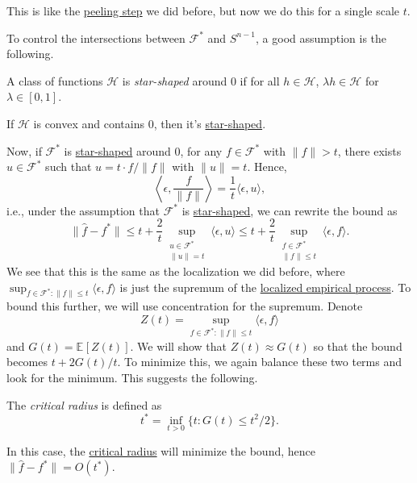 \begin{intuition}
	This is like the \hyperref[eq:peeling-step]{peeling step} we did before, but now we do this for a single scale \(t\).
\end{intuition}

To control the intersections between \(\mathscr{F} ^{\ast} \) and \(S^{n-1}\), a good assumption is the following.

\begin{definition}\label{def:star-shaped}
	A class of functions \(\mathscr{H} \) is \emph{star-shaped} around \(0\) if for all \(h\in \mathscr{H} \), \(\lambda h\in \mathscr{H} \) for \(\lambda \in [0, 1]\).
\end{definition}

\begin{eg}
	If \(\mathscr{H} \) is convex and contains \(0\), then it's \hyperref[def:star-shaped]{star-shaped}.
\end{eg}

Now, if \(\mathscr{F} ^{\ast} \) is \hyperref[def:star-shaped]{star-shaped} around \(0\), for any \(f\in \mathscr{F} ^{\ast} \) with \(\lVert f \rVert > t\), there exists \(u \in \mathscr{F} ^{\ast} \) such that \(u = t \cdot f / \lVert f \rVert \) with \(\lVert u \rVert = t\). Hence,
\[
	\left\langle \epsilon , \frac{f}{\lVert f \rVert } \right\rangle
	= \frac{1}{t} \langle \epsilon , u \rangle ,
\]
i.e., under the assumption that \(\mathscr{F} ^{\ast} \) is \hyperref[def:star-shaped]{star-shaped}, we can rewrite the bound as
\[
	\lVert \hat{f} - f^{\ast} \rVert
	\leq t + \frac{2}{t} \sup _{\substack{u\in \mathscr{F} ^{\ast} \\ \lVert u \rVert = t}} \langle \epsilon , u \rangle
	\leq t + \frac{2}{t} \sup _{\substack{f\in \mathscr{F} ^{\ast} \\ \lVert f \rVert \leq t}} \langle \epsilon , f \rangle .
\]
We see that this is the same as the localization we did before, where \(\sup _{f\in \mathscr{F} ^{\ast} \colon \lVert f \rVert \leq t} \langle \epsilon , f \rangle \) is just the supremum of the \hyperref[def:localized-EP]{localized empirical process}. To bound this further, we will use concentration for the supremum. Denote
\[
	Z(t) = \sup _{f\in \mathscr{F} ^{\ast} \colon \lVert f \rVert \leq t} \langle \epsilon , f \rangle
\]
and \(G(t) = \mathbb{E}_{}\left[Z(t) \right] \). We will show that \(Z(t) \approx G(t)\) so that the bound becomes \(t + 2 G(t) / t\). To minimize this, we again balance these two terms and look for the minimum. This suggests the following.

\begin{definition}\label{def:critical-radius}
	The \emph{critical radius} is defined as
	\[
		t^{\ast} = \inf _{t > 0} \{ t \colon G(t) \leq t^2 / 2 \} .
	\]
\end{definition}

In this case, the \hyperref[def:critical-radius]{critical radius} will minimize the bound, hence \(\lVert \hat{f} - f^{\ast}  \rVert = O(t^{\ast} )\).